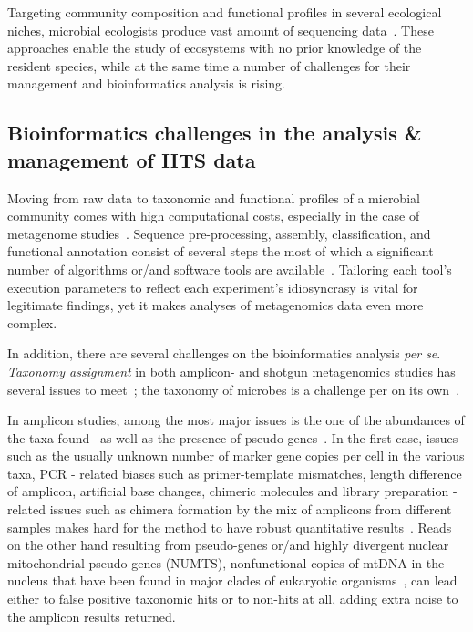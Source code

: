      Targeting community composition and functional profiles in several ecological niches, 
      microbial ecologists produce vast 
      amount of sequencing data~\cite{harrison2021european}.
      These approaches enable the study of ecosystems with no prior knowledge of the resident species, 
      while at the same time a number of challenges for their management and bioinformatics analysis is rising. 
   \subsection{Bioinformatics challenges in the analysis \& management of HTS data}
   \label{subsec:hts_chal}

      Moving from raw data to taxonomic and functional profiles of a microbial community comes with high computational costs, especially in the case of metagenome studies~\cite{yang2021review}.
      Sequence pre-processing, assembly, classification, and functional annotation consist of several steps the most of which a significant number of algorithms or/and software tools are available~\cite{breitwieser2019review, roumpeka2017review}. 
      Tailoring each tool's execution parameters to reflect each experiment's idiosyncrasy is vital for legitimate findings, yet it makes analyses of metagenomics data even more complex. 

      In addition, there are several challenges on the bioinformatics analysis \textit{per se}.
      \textit{Taxonomy assignment} in both amplicon- and shotgun metagenomics studies 
      has several issues to meet~\cite{simon2019benchmarking};
      the taxonomy of microbes is a challenge per on its own~\cite{parks2020complete}.

      In amplicon studies, among the most major issues is the one of the abundances of the
      taxa found~\cite{fonseca2018pitfalls, balint2016millions} as well as the presence of pseudo-genes~\cite{song2008many}.
      In the first case, 
      issues such as  
      the usually unknown number of marker gene copies per cell in the various taxa,
      PCR - related biases such as primer-template mismatches, length difference of amplicon, artificial base changes, chimeric molecules 
      and library preparation - related issues such as chimera formation by the mix of amplicons from different samples
      makes hard for the method to have robust quantitative results~\cite{balint2016millions}. 
      Reads on the other hand resulting from pseudo-genes or/and highly divergent nuclear mitochondrial pseudo-genes (NUMTS), nonfunctional copies of mtDNA in the nucleus that have been found in major clades of eukaryotic organisms~\cite{bensasson2001mitochondrial}, 
      can lead either to false positive taxonomic hits or to non-hits at all,
      adding extra noise to the amplicon results returned.

